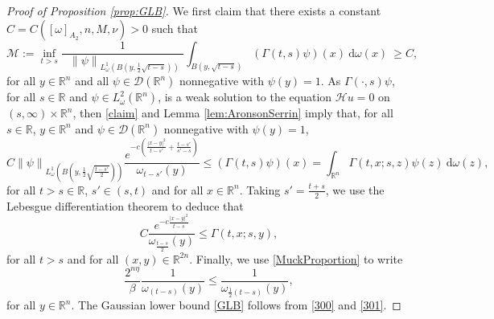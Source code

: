 \documentclass[12pt, letterpaper]{amsart}
\theoremstyle{definition}
\theoremstyle{remark}
\numberwithin{equation}{section}
\begin{document}
\begin{proof}[Proof of Proposition \ref{prop:GLB}]
    We first claim that there exists a constant $C=C([ \omega  ]_{A_2},n,M,\nu)>0$ such that 
    \begin{equation}\label{claim}
        \mathcal{M} := \inf_{t>s} \frac{1}{\ \ \ \left\|  \psi \right\|_{L^1_\omega(B(y,\frac{1}{2}\sqrt{t-s})) \ \ }} \int_{B(y,\sqrt{t-s})} (\Gamma(t,s)\psi)(x)\ \mathrm{d}\omega(x)\ \ge C ,
    \end{equation}
    for all $y \in \mathbb{R}^n$ and all $\psi \in \mathcal{D}(\mathbb{R}^n)$ nonnegative with $\psi(y)=1$. As $\Gamma(\cdot,s)\psi$, for all $s\in \mathbb{R}$ and $\psi \in L^2_\omega(\mathbb{R}^n)$, is a weak solution to the equation $\mathcal{H}u=0$ on $(s,\infty)\times \mathbb{R}^n$, then \eqref{claim} and Lemma \ref{lem:AronsonSerrin} imply that, for all $s\in \mathbb{R}$, $y \in \mathbb{R}^n$ and $\psi \in \mathcal{D}(\mathbb{R}^n)$ nonnegative with $\psi(y)=1$,
    \begin{equation*}
         C \left\|  \psi \right\|_{L^1_\omega(B(y,\frac{1}{2}\sqrt{\frac{t-s'}{2}}))} \frac{e^{-c (\frac{|x-y|^2}{t-s'}+\frac{t-s'}{s'-s})}}{\omega_{t-s'}(y)} \leq (\Gamma(t,s)\psi)(x)= \int_{\mathbb{R}^n} \Gamma(t,x;s,z)\psi(z) \ \mathrm{d}\omega(z),
    \end{equation*}
    for all $t>s \in \mathbb{R}$, $s'\in (s,t)$ and for all $x \in \mathbb{R}^n$. Taking $s'=\frac{t+s}{2}$, we use the Lebesgue differentiation theorem to deduce that 
    \begin{equation}\label{300}
         C \frac{e^{-c \frac{|x-y|^2}{t-s}}}{\omega_{\frac{t-s}{2}}(y)} \leq \Gamma(t,x;s,y),
    \end{equation}
    for all $t>s$ and for all $(x,y) \in \mathbb{R}^{2n}$. Finally, we use \eqref{MuckProportion} to write 
    \begin{equation}\label{301}
        \frac{2^{n\eta}}{\beta} \frac{1}{\omega_{(t-s)}(y)} \leq \frac{1}{\omega_{\frac{1}{2}(t-s)}(y)},
    \end{equation}
    for all $y \in \mathbb{R}^n$. The Gaussian lower bound \eqref{GLB} follows from \eqref{300} and \eqref{301}. 
    

\end{proof}
\end{document}
